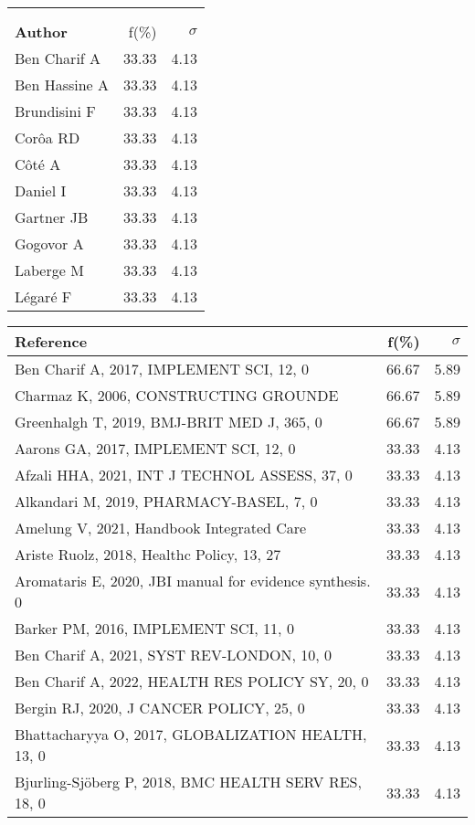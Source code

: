 \documentclass[a4paper,11pt]{report}
\begin{document}
\begin{landscape}
\begin{table}[!ht]
{\begin{tabular}{|p{5cm} r r|}
 &  & \\
 &  & \\
\hline
{\bf Author }& f(\%) & $\sigma$\\
\hline
Ben Charif A & 33.33 & 4.13\\
Ben Hassine A & 33.33 & 4.13\\
Brundisini F & 33.33 & 4.13\\
Corôa RD & 33.33 & 4.13\\
Côté A & 33.33 & 4.13\\
Daniel I & 33.33 & 4.13\\
Gartner JB & 33.33 & 4.13\\
Gogovor A & 33.33 & 4.13\\
Laberge M & 33.33 & 4.13\\
Légaré F & 33.33 & 4.13\\
\hline
\end{tabular}
}
{\scriptsize\begin{tabular}{|p{8cm} r r|}
\hline
{\bf Reference }& f(\%) & $\sigma$\\
\hline
Ben Charif A, 2017, IMPLEMENT SCI, 12, 0 & 66.67 & 5.89\\
Charmaz K, 2006, CONSTRUCTING GROUNDE & 66.67 & 5.89\\
Greenhalgh T, 2019, BMJ-BRIT MED J, 365, 0 & 66.67 & 5.89\\
Aarons GA, 2017, IMPLEMENT SCI, 12, 0 & 33.33 & 4.13\\
Afzali HHA, 2021, INT J TECHNOL ASSESS, 37, 0 & 33.33 & 4.13\\
Alkandari M, 2019, PHARMACY-BASEL, 7, 0 & 33.33 & 4.13\\
Amelung V, 2021, Handbook Integrated Care & 33.33 & 4.13\\
Ariste Ruolz, 2018, Healthc Policy, 13, 27 & 33.33 & 4.13\\
Aromataris E, 2020, JBI manual for evidence synthesis. 0 & 33.33 & 4.13\\
Barker PM, 2016, IMPLEMENT SCI, 11, 0 & 33.33 & 4.13\\
Ben Charif A, 2021, SYST REV-LONDON, 10, 0 & 33.33 & 4.13\\
Ben Charif A, 2022, HEALTH RES POLICY SY, 20, 0 & 33.33 & 4.13\\
Bergin RJ, 2020, J CANCER POLICY, 25, 0 & 33.33 & 4.13\\
Bhattacharyya O, 2017, GLOBALIZATION HEALTH, 13, 0 & 33.33 & 4.13\\
Bjurling-Sjöberg P, 2018, BMC HEALTH SERV RES, 18, 0 & 33.33 & 4.13\\

\end{tabular}}
\end{table}
\end{landscape}
\end{document}
